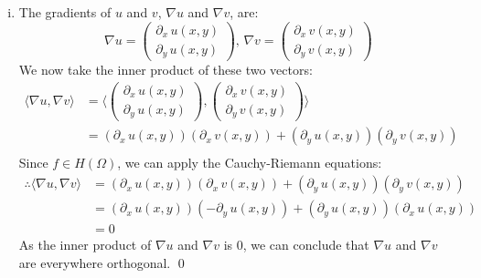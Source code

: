 \documentclass[a4paper, titlepage, DIV=14]{scrartcl}
\begin{document}
\begin{enumerate}[(i)]
        \item The gradients of $u$ and $v$, $\nabla u$ and $\nabla v$, are:
        \begin{equation*}
            \nabla u = 
            \begin{pmatrix}
                \partial_{x} \, u(x,y) \\
                \partial_{y} \, u(x,y)   
            \end{pmatrix}, \, 
            \nabla v = 
            \begin{pmatrix}
                \partial_{x} \, v(x,y) \\
                \partial_{y} \, v(x,y)   
            \end{pmatrix}
        \end{equation*}
        We now take the inner product of these two vectors:
        \begin{align*}
            \langle \nabla u, \nabla v \rangle &= \langle 
            \begin{pmatrix}
                \partial_{x} \, u(x,y) \\
                \partial_{y} \, u(x,y)   
            \end{pmatrix}, 
            \begin{pmatrix}
                \partial_{x} \, v(x,y) \\
                \partial_{y} \, v(x,y)   
            \end{pmatrix} 
            \rangle \\
            &= (\partial_{x} \, u(x,y))(\partial_{x} \, v(x,y)) 
                + (\partial_{y} \, u(x,y))(\partial_{y} \, v(x,y)) \\
        \end{align*}
        Since $f\in H(\Omega)$, we can apply the Cauchy-Riemann equations:
        \begin{align*}
            \therefore \langle \nabla u, \nabla v \rangle 
                &= (\partial_{x} \, u(x,y))(\partial_{x} \, v(x,y)) 
                + (\partial_{y} \, u(x,y))(\partial_{y} \, v(x,y)) \\
                &= (\partial_{x} \, u(x,y))(-\partial_{y} \, u(x,y)) 
                + (\partial_{y} \, u(x,y))(\partial_{x} \, u(x,y)) \\
                &= 0
        \end{align*}
        As the inner product of $\nabla u$ and $\nabla v$ is $0$, we can conclude that
        $\nabla u$ and $\nabla v$ are everywhere orthogonal. \qed \\
        

\end{enumerate}
\end{document}
